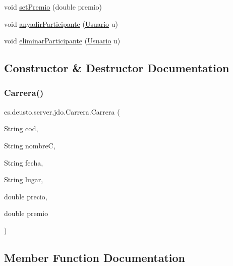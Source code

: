 \begin{DoxyCompactItemize}
\item 
void \mbox{\hyperlink{classes_1_1deusto_1_1server_1_1jdo_1_1_carrera_a815210f549d1d724250882806f9b62c4}{set\+Premio}} (double premio)
\item 
void \mbox{\hyperlink{classes_1_1deusto_1_1server_1_1jdo_1_1_carrera_a95c94d2458e6b8166312d032a0114bcd}{anyadir\+Participante}} (\mbox{\hyperlink{classes_1_1deusto_1_1server_1_1jdo_1_1_usuario}{Usuario}} u)
\item 
void \mbox{\hyperlink{classes_1_1deusto_1_1server_1_1jdo_1_1_carrera_ad813789cd1b62bebb94ce9d8dda19206}{eliminar\+Participante}} (\mbox{\hyperlink{classes_1_1deusto_1_1server_1_1jdo_1_1_usuario}{Usuario}} u)
\end{DoxyCompactItemize}


\subsection{Constructor \& Destructor Documentation}
\mbox{\label{classes_1_1deusto_1_1server_1_1jdo_1_1_carrera_abab4ccd232d2b18ee46d2bf9e01c7363}} 
\subsubsection{\texorpdfstring{Carrera()}{Carrera()}}
{\footnotesize\ttfamily es.\+deusto.\+server.\+jdo.\+Carrera.\+Carrera (\begin{DoxyParamCaption}\item[{String}]{cod,  }\item[{String}]{nombreC,  }\item[{String}]{fecha,  }\item[{String}]{lugar,  }\item[{double}]{precio,  }\item[{double}]{premio }\end{DoxyParamCaption})}



\subsection{Member Function Documentation}
\mbox{\label{classes_1_1deusto_1_1server_1_1jdo_1_1_carrera_a95c94d2458e6b8166312d032a0114bcd}} 
